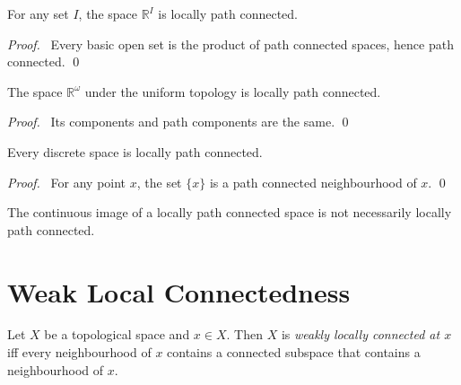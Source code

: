 \begin{prop}
For any set $I$,
 the space $\mathbb{R}^I$ is locally path connected.
\end{prop}

\begin{proof}
\pf\ Every basic open set is the product of path connected spaces, hence path
connected. \qed
\end{proof}

\begin{prop}
 The space $\mathbb{R}^\omega$ under the uniform topology is locally path
connected.
\end{prop}

\begin{proof}
\pf\ Its components and path components are the same. \qed
\end{proof}

\begin{prop}
 Every discrete space is locally path connected.
\end{prop}

\begin{proof}
 \pf\ For any point $x$, the set $\{x\}$ is a path connected neighbourhood of $x$. \qed
\end{proof}

\begin{cor}
 The continuous image of a locally path connected space is not necessarily locally path connected.
\end{cor}


\section{Weak Local Connectedness}


\begin{df}
  Let $X$ be a topological space and $x \in X$. Then $X$ is \emph{weakly
    locally connected at $x$} iff every neighbourhood of $x$ contains a
  connected subspace that contains a neighbourhood of $x$.
\end{df}
